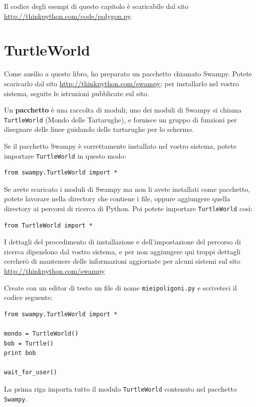 \documentclass[10pt]{book}
\begin{document}
Il codice degli esempi di questo capitolo è scaricabile dal sito
\url{http://thinkpython.com/code/polygon.py}.


\section{TurtleWorld}
\label{turtleworld}

Come ausilio a questo libro, ho preparato un pacchetto chiamato Swampy. Potete scaricarlo dal sito \url{http://thinkpython.com/swampy};
per installarlo nel vostro sistema, seguite le istruzioni pubblicate sul sito.

Un {\bf pacchetto} è una raccolta di moduli; uno dei moduli di Swampy si chiama
{\tt TurtleWorld} (Mondo delle Tartarughe), e fornisce un gruppo di funzioni per disegnare delle linee guidando delle tartarughe per lo schermo.

Se il pacchetto Swampy è correttamente installato nel vostro sistema, potete importare {\tt TurtleWorld} in questo modo:

\begin{verbatim}
from swampy.TurtleWorld import *
\end{verbatim}

Se avete scaricato i moduli di Swampy ma non li avete installati come pacchetto, potete lavorare nella directory che contiene i file, oppure aggiungere quella directory ai percorsi di ricerca di Python. Poi potete importare
{\tt TurtleWorld} così:

\begin{verbatim}
from TurtleWorld import *
\end{verbatim}

I dettagli del procedimento di installazione e dell'impostazione del percorso di ricerca dipendono dal vostro sistema, e per non aggiungere qui troppi dettagli cercherò di mantenere delle informazioni aggiornate per alcuni sistemi sul sito  \url{http://thinkpython.com/swampy}

Create con un editor di testo un file di nome {\tt mieipoligoni.py} e scriveteci il codice seguente:

\begin{verbatim}
from swampy.TurtleWorld import *

mondo = TurtleWorld()
bob = Turtle()
print bob

wait_for_user()
\end{verbatim}
%
La prima riga importa tutto il modulo {\tt TurtleWorld} contenuto nel pacchetto  
{\tt Swampy}.
\end{document}
